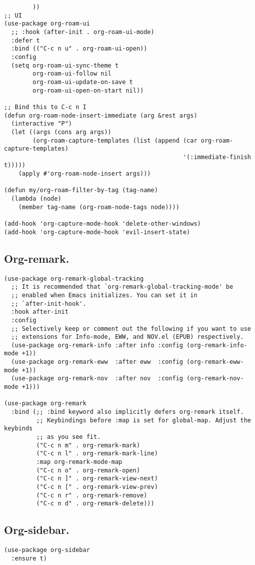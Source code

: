 \documentclass[11pt]{article}
\begin{document}
\begin{verbatim}
        ))
;; UI
(use-package org-roam-ui
  ;; :hook (after-init . org-roam-ui-mode)
  :defer t
  :bind (("C-c n u" . org-roam-ui-open))
  :config
  (setq org-roam-ui-sync-theme t
        org-roam-ui-follow nil
        org-roam-ui-update-on-save t
        org-roam-ui-open-on-start nil))

;; Bind this to C-c n I
(defun org-roam-node-insert-immediate (arg &rest args)
  (interactive "P")
  (let ((args (cons arg args))
        (org-roam-capture-templates (list (append (car org-roam-capture-templates)
                                                  '(:immediate-finish t)))))
    (apply #'org-roam-node-insert args)))

(defun my/org-roam-filter-by-tag (tag-name)
  (lambda (node)
    (member tag-name (org-roam-node-tags node))))

(add-hook 'org-capture-mode-hook 'delete-other-windows)
(add-hook 'org-capture-mode-hook 'evil-insert-state)
\end{verbatim}
\subsection{Org-remark.}
\label{sec:orgb4bb28c}
\begin{verbatim}
(use-package org-remark-global-tracking
  ;; It is recommended that `org-remark-global-tracking-mode' be
  ;; enabled when Emacs initializes. You can set it in
  ;; `after-init-hook'.
  :hook after-init
  :config
  ;; Selectively keep or comment out the following if you want to use
  ;; extensions for Info-mode, EWW, and NOV.el (EPUB) respectively.
  (use-package org-remark-info :after info :config (org-remark-info-mode +1))
  (use-package org-remark-eww  :after eww  :config (org-remark-eww-mode +1))
  (use-package org-remark-nov  :after nov  :config (org-remark-nov-mode +1)))

(use-package org-remark
  :bind (;; :bind keyword also implicitly defers org-remark itself.
         ;; Keybindings before :map is set for global-map. Adjust the keybinds
         ;; as you see fit.
         ("C-c n m" . org-remark-mark)
         ("C-c n l" . org-remark-mark-line)
         :map org-remark-mode-map
         ("C-c n o" . org-remark-open)
         ("C-c n ]" . org-remark-view-next)
         ("C-c n [" . org-remark-view-prev)
         ("C-c n r" . org-remark-remove)
         ("C-c n d" . org-remark-delete)))
\end{verbatim}
\subsection{Org-sidebar.}
\label{sec:org97b874f}
\begin{verbatim}
(use-package org-sidebar
  :ensure t)
\end{verbatim}
\end{document}
